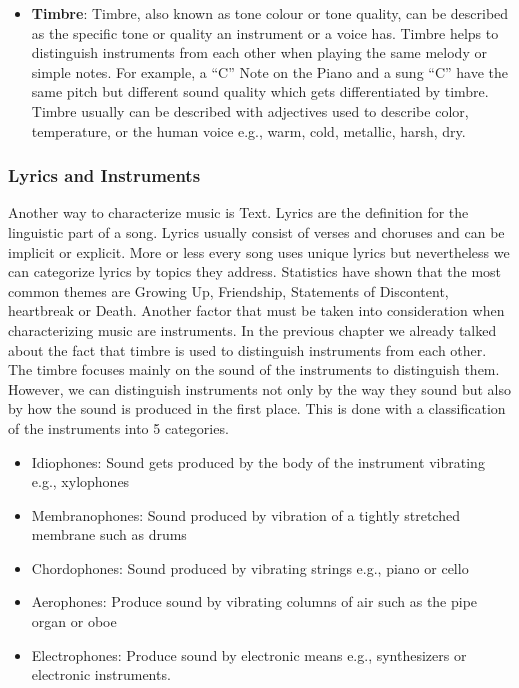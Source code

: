 \begin{itemize}
    \item \textbf{Timbre}: Timbre, also known as tone colour or tone quality,
    can be described as the specific tone or quality an instrument or a voice has.
    Timbre helps to distinguish instruments from each other when playing the same melody or simple notes.
    For example, a “C” Note on the Piano and a sung “C” have the same pitch but different sound
    quality which gets differentiated by timbre.
    Timbre usually can be described with adjectives used to describe color, temperature,
    or the human voice e.g., warm, cold, metallic, harsh, dry.\cite[94]{Hemming2015}

\end{itemize}

\subsubsection{Lyrics and Instruments}

Another way to characterize music is Text. Lyrics are the definition for the linguistic part of a song.
Lyrics usually consist of verses and choruses and can be implicit or explicit.
More or less every song uses unique lyrics but nevertheless we can categorize lyrics by topics they address.\cite{Shipman2014Analysis}
Statistics have shown that the most common themes are Growing Up, Friendship, Statements of Discontent,
heartbreak or Death.\cite{2020AIMMListening}
Another factor that must be taken into consideration when characterizing music are instruments.
In the previous chapter we already talked about the fact that timbre is used to distinguish instruments
from each other.
The timbre focuses mainly on the sound of the instruments to distinguish them.
However, we can distinguish instruments not only by the way they sound but also by how the sound is produced
in the first place.
This is done with a classification of the instruments into 5 categories.

\begin{itemize}
    \item Idiophones: Sound gets produced by the body of the instrument vibrating e.g., xylophones
    \item Membranophones: Sound produced by vibration of a tightly stretched membrane such as drums
    \item Chordophones: Sound produced by vibrating strings e.g., piano or cello
    \item Aerophones: Produce sound by vibrating columns of air such as the pipe organ or oboe
    \item Electrophones: Produce sound by electronic means e.g., synthesizers or electronic instruments.
\end{itemize}

